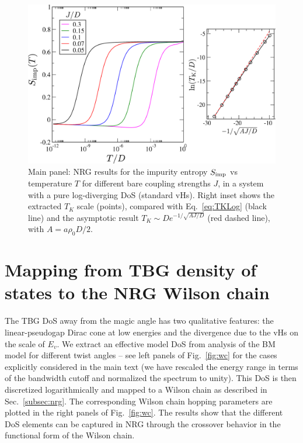 \begin{figure}[h!]
	\centering
	\includegraphics[width = \linewidth]{figures/chapter2/Slog_labels.pdf}
	\caption{
		\small Main panel: NRG results for the impurity entropy $S_{\rm imp}$ vs temperature $T$ for different bare coupling strengths $J$, in a system with a pure log-diverging DoS (standard vHs). Right inset shows the extracted $T_K$ scale (points), compared with Eq.~\ref{eq:TKLog} (black line) and the asymptotic result $T_K \sim D e^{-1/\sqrt{A J/D}}$ (red dashed line), with $A=a\rho_0 D/2$.}
	\label{fig:Slog}
\end{figure}


\section{Mapping from TBG density of states to the NRG Wilson chain}

The TBG DoS away from the magic angle has two qualitative features: the linear-pseudogap Dirac cone at low energies and the divergence due to the vHs on the scale of $E_v$. We extract an effective model DoS from analysis of the BM model for different twist angles -- see left panels of Fig.~\ref{fig:wc} for the cases explicitly considered in the main text (we have rescaled the energy range in terms of the bandwidth cutoff and normalized the spectrum to unity). This DoS is then discretized logarithmically and mapped to a Wilson chain \cite{bulla2008numerical} as described in Sec.~\ref{subsec:nrg}. The corresponding Wilson chain hopping parameters are plotted in the right panels of Fig.~\ref{fig:wc}. The results show that the different DoS elements can be captured in NRG through the crossover behavior in the functional form of the Wilson chain.



